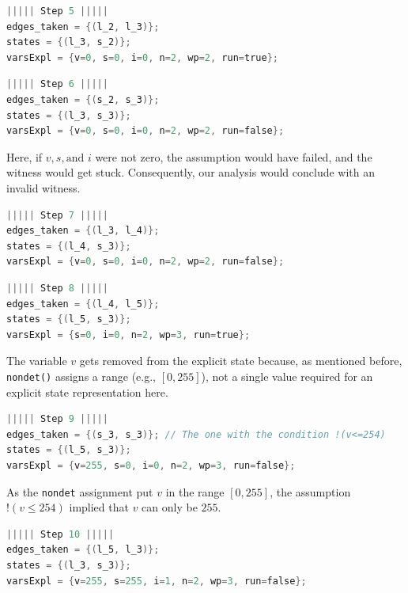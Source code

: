 \begin{lstlisting}[style=C, language=C, basicstyle=\ttfamily\footnotesize, columns=flexible,
    breaklines=true, breakatwhitespace=true, tabsize=2, showstringspaces=false]
||||| Step 5 |||||
edges_taken = {(l_2, l_3)};
states = {(l_3, s_2)};
varsExpl = {v=0, s=0, i=0, n=2, wp=2, run=true};
\end{lstlisting}
\begin{lstlisting}[style=C, language=C, basicstyle=\ttfamily\footnotesize, columns=flexible,
    breaklines=true, breakatwhitespace=true, tabsize=2, showstringspaces=false]
||||| Step 6 |||||
edges_taken = {(s_2, s_3)};
states = {(l_3, s_3)};
varsExpl = {v=0, s=0, i=0, n=2, wp=2, run=false};
\end{lstlisting}
Here, if $v, s, \text{and } i$ were not zero, the assumption would have failed, and the witness
would get stuck. Consequently, our analysis would conclude with an invalid witness.
\begin{lstlisting}[style=C, language=C, basicstyle=\ttfamily\footnotesize, columns=flexible,
    breaklines=true, breakatwhitespace=true, tabsize=2, showstringspaces=false]
||||| Step 7 |||||
edges_taken = {(l_3, l_4)};
states = {(l_4, s_3)};
varsExpl = {v=0, s=0, i=0, n=2, wp=2, run=false};
\end{lstlisting}
\begin{lstlisting}[style=C, language=C, basicstyle=\ttfamily\footnotesize, columns=flexible,
    breaklines=true, breakatwhitespace=true, tabsize=2, showstringspaces=false]
||||| Step 8 |||||
edges_taken = {(l_4, l_5)};
states = {(l_5, s_3)};
varsExpl = {s=0, i=0, n=2, wp=3, run=true};
\end{lstlisting}
The variable $v$ gets removed from the explicit state because, as mentioned before, \texttt{nondet()}
assigns a range (e.g., $[0,255]$), not a single value required for an explicit state representation here.
\begin{lstlisting}[style=C, language=C, basicstyle=\ttfamily\footnotesize, columns=flexible,
    breaklines=true, breakatwhitespace=true, tabsize=2, showstringspaces=false]
||||| Step 9 |||||
edges_taken = {(s_3, s_3)}; // The one with the condition !(v<=254)
states = {(l_5, s_3)};
varsExpl = {v=255, s=0, i=0, n=2, wp=3, run=false};
\end{lstlisting}
As the \texttt{nondet} assignment put $v$ in the range $[0, 255]$, the assumption $!(v\le254)$
implied that $v$ can only be $255$.
\begin{lstlisting}[style=C, language=C, basicstyle=\ttfamily\footnotesize, columns=flexible,
    breaklines=true, breakatwhitespace=true, tabsize=2, showstringspaces=false]
||||| Step 10 |||||
edges_taken = {(l_5, l_3)};
states = {(l_3, s_3)};
varsExpl = {v=255, s=255, i=1, n=2, wp=3, run=false};
\end{lstlisting}
